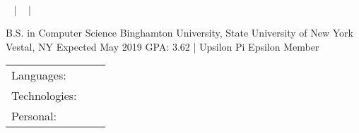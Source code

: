 \documentclass[]{awesome-cv}
\begin{document}
\begin{center}
	\ \ \  \\
	\vspace{2mm}
	{\faEnvelope\ } | {\faPhone\ } | {\faLink\ }
\end{center}

\begin{cventries}
	\cventry
	{B.S. in Computer Science}
	{Binghamton University, State University of New York}
	{Vestal, NY}
	{Expected May 2019}
	{GPA: 3.62 | Upsilon Pi Epsilon Member}
\end{cventries}
\vspace{-2mm}

\begin{cventries}
	\cventry
	{}
	{\def\arraystretch{1.15}{\begin{tabular}{ l l }
		Languages:  & \ \ \skill{{ C++, Python, Java, C, HTML, CSS}} \\
		Technologies:  & \ \ \skill{{ MacOS, Linux, Windows, Git, Vim}} \\
		Personal:  & \ \ \skill{{ Communication, organization, teamwork, leadership, critical thinking}} \\
	\end{tabular}}}
	{}
	{}
	{}
\end{cventries}
\vspace{-9mm}
\end{document}
